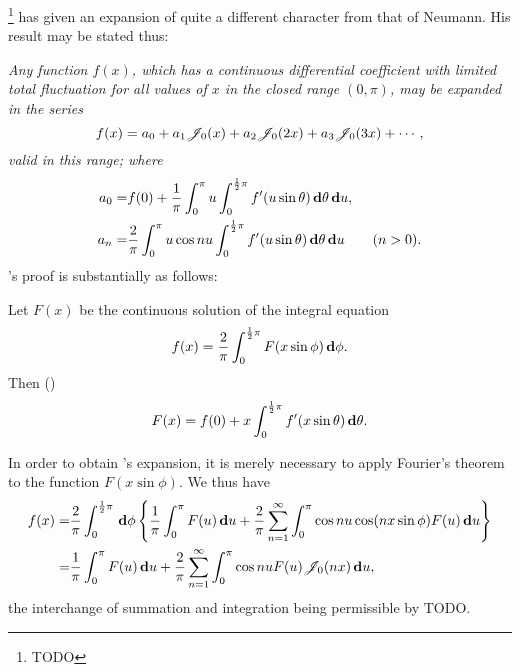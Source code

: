 \Schlomilch\footnote{TODO} has given an expansion of quite a different
character from that of Neumann. His result may be stated thus:

\emph{
  Any function $f(x)$, which has a continuous differential coefficient
  with limited total fluctuation for all values of $x$ in the closed
  range $(0,\pi)$, may be expanded in the series
  $$
  f(x)
  =
  a_{0} + a_{1} \mathscr{J}_{0}(x) + a_{2} \mathscr{J}_{0}(2x) + a_{3} \mathscr{J}_{0}(3x) + \cdots,
  $$
  valid in this range; where
  \begin{align*}
    a_{0} =& f(0)
    +
    \frac{1}{\pi}
    \int_{0}^{\pi} u
    \int_{0}^{\frac{1}{2}\pi} f'(u\sin\theta)
    \, \mathbf{d}\theta \, \mathbf{d} u,
    \\
    a_{n} =&
    \frac{2}{\pi}
    \int_{0}^{\pi} u\cos nu
    \int_{0}^{\frac{1}{2}\pi} f'(u\sin\theta)
    \, \mathbf{d}\theta \, \mathbf{d} u
    \qquad (n>0).
  \end{align*}
}
\Schlomilch's proof is substantially as follows:

Let $F(x)$ be the continuous solution of the integral equation
$$
f(x) = \frac{2}{\pi} \int_{0}^{\frac{1}{2} \pi} F(x \sin\phi) \, \mathbf{d} \phi.
$$
Then ()
$$
F(x) = f(0) + x \int_{0}^{\frac{1}{2}\pi} f'(x\sin\theta) \, \mathbf{d}\theta.
$$

In order to obtain \Schlomilch's expansion, it is merely necessary to
apply Fourier's theorem to the function $F(x\sin\phi)$. We thus have
\begin{align*}
  f(x)
  =&
  \frac{2}{\pi}
  \int_{0}^{\frac{1}{2}\pi}
  \, \mathbf{d}\phi
  \left\{ 
    \frac{1}{\pi}
    \int_{0}^{\pi} F(u) \, \mathbf{d} u
    +
    \frac{2}{\pi}
    \sum_{n=1}^{\infty}
    \int_{0}^{\pi} \cos nu \cos(nx\sin\phi) F(u) \, \mathbf{d} u
   \right\}
  \\
  =&
  \frac{1}{\pi}
  \int_{0}^{\pi}
  F(u) \, \mathbf{d} u
  +
  \frac{2}{\pi}
  \sum_{n=1}^{\infty}
  \int_{0}^{\pi} \cos nu F(u) \mathscr{J}_{0}(nx) \, \mathbf{d} u,
\end{align*}
the interchange of summation and integration being permissible by
TODO.
%
%

